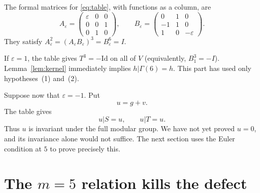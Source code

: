 \documentclass[11pt]{article}
\theoremstyle{remark}
\newcommand{\eps}{\varepsilon}
\begin{document}
The formal matrices for \eqref{eq:table}, with functions as a column,
are
\begin{equation}\label{eq:matrices}
 A_\eps=\begin{pmatrix}\eps&0&0\\0&0&1\\0&1&0\end{pmatrix},\qquad
 B_\eps=\begin{pmatrix}0&1&0\\-1&1&0\\1&0&-\eps\end{pmatrix}.
\end{equation}
They satisfy $A_\eps^2=(A_\eps B_\eps)^3=B_\eps^6=I$.

If $\eps=1$, the table gives $T^3=-\mathrm{Id}$ on all of $V$
(equivalently, $B_1^3=-I$).  Lemma~\ref{lem:kernel} immediately implies
$h|\Gamma(6)=h$.  This part has used only hypotheses~(1) and~(2).

Suppose now that $\eps=-1$.  Put
\begin{equation}\label{eq:u}
 u=g+v.
\end{equation}
The table gives
\begin{equation}\label{eq:u-inv}
 u|S=u,\qquad u|T=u.
\end{equation}
Thus $u$ is invariant under the full modular group.  We have not yet
proved $u=0$, and its invariance alone would not suffice.  The next
section uses the Euler condition at $5$ to prove precisely this.

\section{The \texorpdfstring{$m=5$}{m=5} relation kills the defect}
\end{document}
